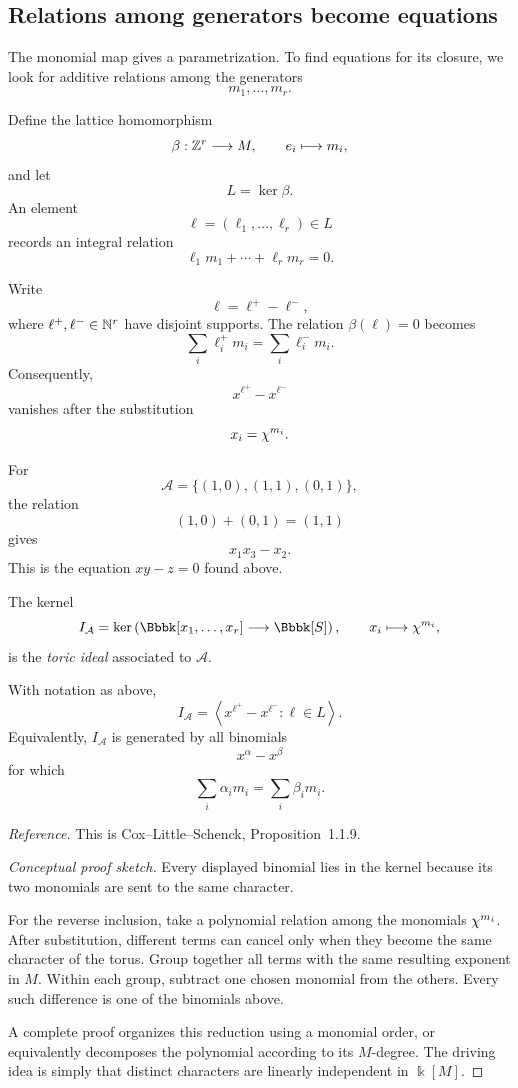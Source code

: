 \subsection{Relations among generators become equations}

The monomial map gives a parametrization. To find equations for its
closure, we look for additive relations among the generators
\[
m_1,\ldots,m_r.
\]

Define the lattice homomorphism
\[
\beta:\mathbb{Z}^r\longrightarrow M,
\qquad
e_i\longmapsto m_i,
\]
and let
\[
L=\ker\beta.
\]
An element
\[
\ell=(\ell_1,\ldots,\ell_r)\in L
\]
records an integral relation
\[
\ell_1m_1+\cdots+\ell_rm_r=0.
\]

Write
\[
\ell=\ell^+-\ell^-,
\]
where \(\ell^+,\ell^-\in\mathbb{N}^r\) have disjoint supports. The relation
\(\beta(\ell)=0\) becomes
\[
\sum_i\ell_i^+m_i
=
\sum_i\ell_i^-m_i.
\]
Consequently,
\[
x^{\ell^+}-x^{\ell^-}
\]
vanishes after the substitution
\[
x_i=\chi^{m_i}.
\]

\begin{example}
For
\[
\mathcal A=\{(1,0),(1,1),(0,1)\},
\]
the relation
\[
(1,0)+(0,1)=(1,1)
\]
gives
\[
x_1x_3-x_2.
\]
This is the equation \(xy-z=0\) found above.
\end{example}

\begin{definition}
The kernel
\[
I_{\mathcal A}
=
\ker\left(
\Bbbk[x_1,\ldots,x_r]
\longrightarrow
\Bbbk[S]
\right),
\qquad
x_i\longmapsto\character{m_i},
\]
is the \emph{toric ideal} associated to \(\mathcal A\).
\end{definition}

\begin{proposition}
\label{prop:toric-ideal-binomial-relations}
With notation as above,
\[
I_{\mathcal A}
=
\left\langle
x^{\ell^+}-x^{\ell^-}:
\ell\in L
\right\rangle.
\]
Equivalently, \(I_{\mathcal A}\) is generated by all binomials
\[
x^\alpha-x^\beta
\]
for which
\[
\sum_i\alpha_i m_i
=
\sum_i\beta_i m_i.
\]
\end{proposition}

\noindent
\textit{Reference.}
This is Cox--Little--Schenck, Proposition~1.1.9.

\begin{proof}[Conceptual proof sketch]
Every displayed binomial lies in the kernel because its two monomials
are sent to the same character.

For the reverse inclusion, take a polynomial relation among the
monomials \(\chi^{m_i}\). After substitution, different terms can
cancel only when they become the same character of the torus.
Group together all terms with the same resulting exponent in \(M\).
Within each group, subtract one chosen monomial from the others.
Every such difference is one of the binomials above.

A complete proof organizes this reduction using a monomial order, or
equivalently decomposes the polynomial according to its \(M\)-degree.
The driving idea is simply that distinct characters are linearly
independent in \(\Bbbk[M]\).
\end{proof}

